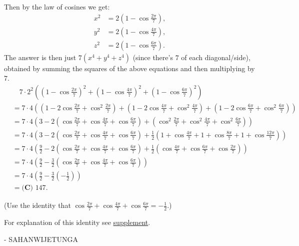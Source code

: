 \begin{enumerate}
 Then by the law of cosines we get:
 \begin{align*} x^2 &= 2\left(1-\cos\frac{2\pi}{7}\right), \\ y^2 &= 2\left(1-\cos\frac{4\pi}{7}\right), \\ z^2 &= 2\left(1-\cos\frac{6\pi}{7}\right). \end{align*}
The answer is then just $7(x^4+y^4+z^4)$ (since there's $7$ of each diagonal/side), obtained by summing the squares of the above equations and then multiplying by $7$. 
 \begin{align*} & \quad7\cdot2^2\left( \left(1-\cos\frac{2\pi}{7}\right)^2 + \left(1-\cos\frac{4\pi}{7}\right)^2 + \left(1-\cos\frac{6\pi}{7}\right)^2 \right) \\ &= 7\cdot4\left( \left(1-2\cos\frac{2\pi}{7}+\cos^2\frac{2\pi}{7}\right) + \left(1-2\cos\frac{4\pi}{7}+\cos^2\frac{4\pi}{7}\right) + \left(1-2\cos\frac{6\pi}{7}+\cos^2\frac{6\pi}{7}\right) \right) \\ &= 7\cdot4\left(3-2\left(\cos\frac{2\pi}{7}+\cos\frac{4\pi}{7}+\cos\frac{6\pi}{7}\right) + \left(\cos^2\frac{2\pi}{7}+\cos^2\frac{4\pi}{7}+\cos^2\frac{6\pi}{7}\right) \right) \\ &= 7\cdot4\left(3-2\left(\cos\frac{2\pi}{7}+\cos\frac{4\pi}{7}+\cos\frac{6\pi}{7}\right) + \frac12 \left(1+\cos\frac{4\pi}{7}+1+\cos\frac{8\pi}{7}+1+\cos\frac{12\pi}{7}\right) \right) \\ &= 7\cdot4\left(\frac{9}{2}-2\left(\cos\frac{2\pi}{7}+\cos\frac{4\pi}{7}+\cos\frac{6\pi}{7}\right) + \frac12 \left(\cos\frac{4\pi}{7}+\cos\frac{6\pi}{7}+\cos\frac{2\pi}{7}\right) \right) \\ &= 7\cdot4\left(\frac{9}{2}-\frac{3}{2}\left(\cos\frac{2\pi}{7}+\cos\frac{4\pi}{7}+\cos\frac{6\pi}{7}\right) \right) \\ &= 7\cdot4\left(\frac{9}{2}-\frac{3}{2}\left(-\frac{1}{2}\right)\right) \\ &= \boxed{\textbf{(C) }147}. \end{align*}


 (Use the identity that $\cos\frac{2\pi}{7}+\cos\frac{4\pi}{7}+\cos\frac{6\pi}{7} = -\frac{1}{2}$.)

 For explanation of this identity see \href{https://artofproblemsolving.com/wiki/index.php/2022\_AMC\_12B\_Problems/Problem\_24\#Supplement\_.28Explanation\_to\_Why\_cos.282.CF.80.2F7.29\_.2B\_cos.284.CF.80.2F7.29\_.2B\_cos.286.CF.80.2F7.29\_.3D\_-1.2F2.29}{supplement}.

 - SAHANWIJETUNGA

 




\end{enumerate}
